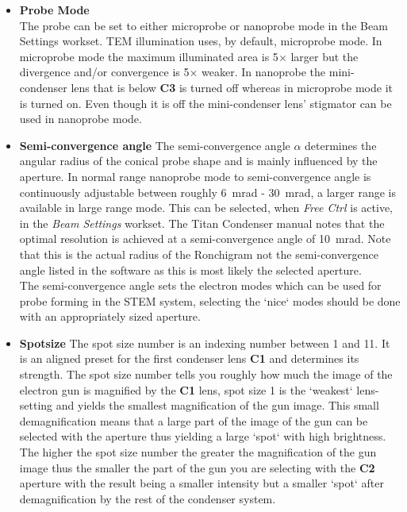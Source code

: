 \documentclass[a4paper]{scrartcl}
\begin{document}
\begin{itemize}
	\item {\textbf{Probe Mode}\\
		The probe can be set to either microprobe or nanoprobe mode in the Beam Settings workset. TEM illumination uses, by default, microprobe mode. In microprobe mode the maximum illuminated area is 5$\times$ larger but the divergence and/or convergence is 5$\times$ weaker. In nanoprobe the mini-condenser lens that is below \textbf{C3} is turned off whereas in microprobe mode it is turned on. Even though it is off the mini-condenser lens' stigmator can be used in nanoprobe mode.}

	\item{\textbf{Semi-convergence angle}
		The semi-convergence angle $\alpha$ determines the angular radius of the conical probe shape and is mainly influenced by the aperture. In normal range nanoprobe mode to semi-convergence angle is continuously adjustable between roughly \SI{6}{\milli \radian} - \SI{30}{\milli \radian}, a larger range is available in large range mode. This can be selected, when \textit{Free Ctrl} is active, in the \textit{Beam Settings} workset. The Titan Condenser manual notes that the optimal resolution is achieved at a semi-convergence angle of \SI{10}{\milli \radian}. Note that this is the actual radius of the Ronchigram not the semi-convergence angle listed in the software as this is most likely the selected aperture.\\
	The semi-convergence angle sets the electron modes which can be used for probe forming in the STEM system, selecting the `nice` modes should be done with an appropriately sized aperture.}

	\item{\textbf{Spotsize}}
		The spot size number is an indexing number between 1 and 11. It is an aligned preset for the first condenser lens \textbf{C1} and determines its strength. The spot size number tells you roughly how much the image of the electron gun is magnified by the \textbf{C1} lens, spot size 1 is the `weakest` lens-setting and yields the smallest magnification of the gun image. This small demagnification means that a large part of the image of the gun can be selected with the aperture thus yielding a large `spot` with high brightness. The higher the spot size number the greater the magnification of the gun image thus the smaller the part of the gun you are selecting with the \textbf{C2} aperture with the result being a smaller intensity but a smaller `spot` after demagnification by the rest of the condenser system.


\end{itemize}
\end{document}
